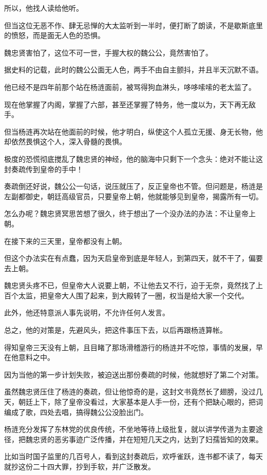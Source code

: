 \begin{multicols}{\theparacolNo}
所以，他找人读给他听。

但当这位无恶不作、肆无忌惮的大太监听到一半时，便打断了朗读，不是歇斯底里的愤怒，而是面无人色的恐惧。

魏忠贤害怕了，这位不可一世，手握大权的魏公公，竟然害怕了。

据史料的记载，此时的魏公公面无人色，两手不由自主颤抖，并且半天沉默不语。

他已经不是四年前那个站在杨涟面前，被骂得狗血淋头，哆哆嗦嗦的老太监了。

现在他掌握了内阁，掌握了六部，甚至还掌握了特务，他一度以为，天下再无敌手。

但当杨涟再次站在他面前的时候，他才明白，纵使这个人孤立无援、身无长物，他却依然畏惧这个人，深入骨髓的畏惧。

极度的恐慌彻底搅乱了魏忠贤的神经，他的脑海中只剩下一个念头：绝对不能让这封奏疏传到皇帝的手中！

奏疏倒还好说，魏公公一句话，说压就压了，反正皇帝也不管。但问题是，杨涟是左副都御史，朝廷高级官员，只要皇帝上朝，他就能够见到皇帝，揭露所有一切。

怎么办呢？魏忠贤冥思苦想了很久，终于想出了一个没办法的办法：不让皇帝上朝。

在接下来的三天里，皇帝都没有上朝。

但这个办法实在有点蠢，因为天启皇帝到底是年轻人，到第四天，就不干了，偏要去上朝。

魏忠贤头疼不已，但皇帝大人说要上朝，不让他去又不行，迫于无奈，竟然找了上百个太监，把皇帝大人围了起来，到大殿转了一圈，权当是给大家一个交代。

此外，他还特意派人事先说明，不允许任何人发言。

总之，他的对策是，先避风头，把这件事压下去，以后再跟杨涟算帐。

得知皇帝三天没有上朝，且目睹了那场滑稽游行的杨涟并不吃惊，事情的发展，早在他意料之中。

因为当他的第一步计划失败，被迫送出那份奏疏的时候，他就想好了第二个对策。

虽然魏忠贤压住了杨涟的奏疏，但让他惊奇的是，这封文书竟然长了翅膀，没过几天，朝廷上下，除了皇帝没看过，大家基本是人手一份，还有个把缺心眼的，把词编成了歌，四处去唱，搞得魏公公没脸出门。

杨涟充分发挥了东林党的优良传统，不坐地等待上级批复，就以讲学传道为主要途径，把魏忠贤的恶劣事迹广泛传播，并在短短几天之内，达到了妇孺皆知的效果。

比如当时国子监里的几百号人，看到这封奏疏后，欢呼雀跃，连书都不读了，每天就抄这份二十四大罪，抄到手软，并广泛散发。


\end{multicols}
